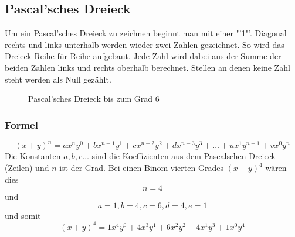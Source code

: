 
\newpage
\subsection{Pascal'sches Dreieck}
Um ein Pascal'sches Dreieck zu zeichnen beginnt man mit einer "'1"'. Diagonal 
rechts und links unterhalb werden wieder zwei Zahlen gezeichnet. So wird das 
Dreieck Reihe für Reihe aufgebaut. Jede Zahl wird dabei aus der Summe der 
beiden Zahlen links und rechts oberhalb berechnet. Stellen an denen keine Zahl 
steht werden als Null gezählt. 
\begin{figure}[h!]
	\centering
\caption{Pascal'sches Dreieck bis zum Grad 6}
\end{figure}

\subsubsection*{Formel}
\[ (x+y)^n = ax^ny^0 + bx^{n-1}y^1 + cx^{n-2}y^2 + dx^{n-3}y^3 + \ldots + ux^{1}y^{n-1} + vx^0y^n \]
Die Konstanten $a,b,c\ldots$ sind die Koeffizienten aus dem Pascalschen Dreieck (Zeilen) und $n$ ist 
der Grad. Bei einen Binom vierten Grades $(x+y)^4$ wären dies 
\[ n=4 \] und \[ a=1, b=4, c=6, d=4, e=1 \]
und somit 
\[ (x+y)^4 = 1x^4y^0 + 4x^3y^1 + 6x^2y^2 + 4x^1y^3 + 1x^0y^4 \]


